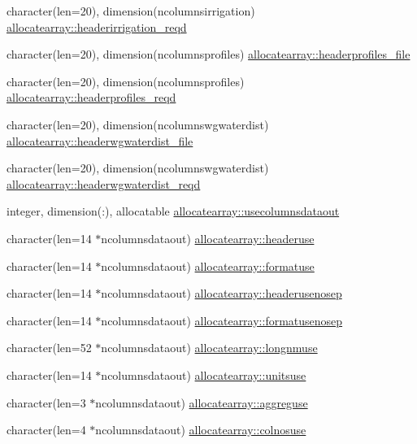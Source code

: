 \begin{DoxyCompactItemize}
\item 
character(len=20), dimension(ncolumnsirrigation) \hyperlink{namespaceallocatearray_a954868db4fef915c78d7daa2ba68e8dc}{allocatearray\+::headerirrigation\+\_\+reqd}
\item 
character(len=20), dimension(ncolumnsprofiles) \hyperlink{namespaceallocatearray_ab80c29dab9c61373913b3adab5decbc9}{allocatearray\+::headerprofiles\+\_\+file}
\item 
character(len=20), dimension(ncolumnsprofiles) \hyperlink{namespaceallocatearray_a54f6a31f434560c3e13bd7835a1bffd8}{allocatearray\+::headerprofiles\+\_\+reqd}
\item 
character(len=20), dimension(ncolumnswgwaterdist) \hyperlink{namespaceallocatearray_a1dc4be815337cd033a0c06090ecd9d45}{allocatearray\+::headerwgwaterdist\+\_\+file}
\item 
character(len=20), dimension(ncolumnswgwaterdist) \hyperlink{namespaceallocatearray_af07ba3471074023fae170857b69c2a4e}{allocatearray\+::headerwgwaterdist\+\_\+reqd}
\item 
integer, dimension(\+:), allocatable \hyperlink{namespaceallocatearray_a66aee2b0878cf1d1cc5502cef18967b4}{allocatearray\+::usecolumnsdataout}
\item 
character(len=14 $\ast$ncolumnsdataout) \hyperlink{namespaceallocatearray_a62706bdf1d2b60377a7e57313210e520}{allocatearray\+::headeruse}
\item 
character(len=14 $\ast$ncolumnsdataout) \hyperlink{namespaceallocatearray_ab9823e63bd1fbe6b3a03661b3f184848}{allocatearray\+::formatuse}
\item 
character(len=14 $\ast$ncolumnsdataout) \hyperlink{namespaceallocatearray_a3c51b4919b1d1ad3e56560fc4409aa43}{allocatearray\+::headerusenosep}
\item 
character(len=14 $\ast$ncolumnsdataout) \hyperlink{namespaceallocatearray_a0e59779b2c97266957b8575e9b411e97}{allocatearray\+::formatusenosep}
\item 
character(len=52 $\ast$ncolumnsdataout) \hyperlink{namespaceallocatearray_a3f68661e372f6193bcfd35d4e245b3bb}{allocatearray\+::longnmuse}
\item 
character(len=14 $\ast$ncolumnsdataout) \hyperlink{namespaceallocatearray_aa6d822a82ea3e0af76f519705a452b0e}{allocatearray\+::unitsuse}
\item 
character(len=3 $\ast$ncolumnsdataout) \hyperlink{namespaceallocatearray_a809990af6a37f51ec5b65de594ab5895}{allocatearray\+::aggreguse}
\item 
character(len=4 $\ast$ncolumnsdataout) \hyperlink{namespaceallocatearray_a8aab8dd16a4f4d4cbc17b0057b356ccb}{allocatearray\+::colnosuse}

\end{DoxyCompactItemize}
